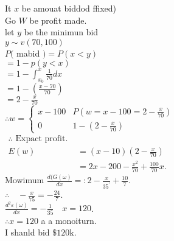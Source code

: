 \documentclass[]{article}
\begin{document}
It $x$ be amouat biddod ffixed)\\
Go $W$ be profit made.\\
let $y$ be the minimun bid\\
$y \sim v(70,100)$\\
$P($ mabid $)=P(x<y)$\\
$=1-p(y<x)$\\
$=1-\int_{x_0}^x \frac{1}{70} d x$\\
$=1-\left(\frac{x-70}{70}\right)$\\
$=2-\frac{x}{70}$\\
$\therefore w= \begin{cases}x-100 & P\left(w=x-100=2-\frac{x}{70}\right) \\ 0 & 1-\left(2-\frac{x}{70}\right)\end{cases}$\\

$\begin{aligned} \therefore \text { Expact profit. } \\ E(w) &=(x-10)\left(2-\frac{x}{70}\right) \\ &=2 x-200-\frac{x^2}{70}+\frac{100}{70} x . \end{aligned}$\\
Mowimum $\frac{d(G(\omega)}{d x}=: 2-\frac{x}{35^{\prime}}+\frac{10}{7}$.\\
$\therefore \quad-\frac{x}{75}=-\frac{24}{7}$.\\
$\frac{d^2 \varepsilon(\omega)}{d x}=-\frac{1}{35} \quad x=120$.\\
$\therefore x=120$ a a monoiturn.\\
I shanld bid $\$ 120 \mathrm{k}$.
\end{document}

